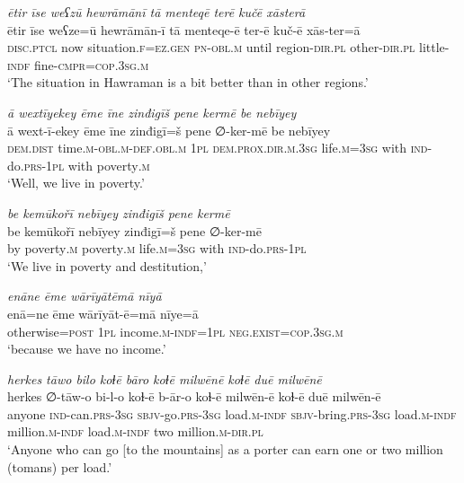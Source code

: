 \ea \label{ŽM.55}
\textit{ētir īse weʕzū hewrāmānī tā menteqē terē kučē xāsterā} \\ 
\gll ētir īse weʕze=ū hewrāmān-ī tā menteqe-ē ter-ē kuč-ē xās-ter=ā \\ 
 \textsc{disc}.\textsc{ptcl} now situation\textsc{.f}\textsc{=ez.gen} \textsc{pn}\textsc{-obl}\textsc{.m} until region\textsc{-dir}\textsc{.pl} other\textsc{-dir}\textsc{.pl} little\textsc{-indf} fine\textsc{-cmpr}\textsc{=cop}\textsc{.3sg}\textsc{.m} \\ 
\glt `The situation in Hawraman is a bit better than in other regions.'
\z 
 
\ea \label{ŽM.57}
\textit{ā wextīyekey ēme īne zinđigīš pene kermē be nebīyey} \\ 
\gll ā wext-ī-ekey ēme īne zinđigī=š pene ∅-ker-mē be nebīyey \\ 
 \textsc{dem.dist} time\textsc{.m}\textsc{-obl}\textsc{.m}\textsc{-def}\textsc{.obl}\textsc{.m} \textsc{1pl} \textsc{dem.prox}\textsc{.dir}\textsc{.m}\textsc{.3sg} life\textsc{.m}\textsc{=3sg} with \textsc{ind-}do\textsc{.prs}\textsc{-\textsc{1pl}} with poverty\textsc{.m} \\ 
\glt `Well, we live in poverty.'
\z 
 
\ea \label{ŽM.58}
\textit{be kemūkořī nebīyey zinđigīš pene kermē} \\ 
\gll be kemūkořī nebīyey zinđigī=š pene ∅-ker-mē \\ 
 by poverty\textsc{.m} poverty\textsc{.m} life\textsc{.m}\textsc{=3sg} with \textsc{ind-}do\textsc{.prs}\textsc{-\textsc{1pl}} \\ 
\glt `We live in poverty and destitution,'
\z 
 
\ea \label{ŽM.59}
\textit{enāne ēme wārīyātēmā nīyā} \\ 
\gll enā=ne ēme wārīyāt-ē=mā nīye=ā \\ 
 otherwise\textsc{=\textsc{post}} \textsc{1pl} income\textsc{.m}\textsc{-indf}\textsc{=\textsc{1pl}} \textsc{\textsc{neg.}exist}\textsc{=cop}\textsc{.3sg}\textsc{.m} \\ 
\glt `because we have no income.'
\z 
 
\ea \label{ŽM.61}
\textit{herkes tāwo bilo koɫē bāro koɫē milwēnē koɫē duē milwēnē} \\ 
\gll herkes ∅-tāw-o bi-l-o koɫ-ē b-ār-o koɫ-ē milwēn-ē koɫ-ē duē milwēn-ē \\ 
 anyone \textsc{ind-}can\textsc{.prs}\textsc{-3sg} \textsc{sbjv-}go\textsc{.prs}\textsc{-3sg} load\textsc{.m}\textsc{-indf} \textsc{sbjv-}bring\textsc{.prs}\textsc{-3sg} load\textsc{.m}\textsc{-indf} million\textsc{.m}\textsc{-indf} load\textsc{.m}\textsc{-indf} two million\textsc{.m}\textsc{-dir}\textsc{.pl} \\ 
\glt `Anyone who can go [to the mountains] as a porter can earn one or two million (tomans) per load.'
\z 
 
